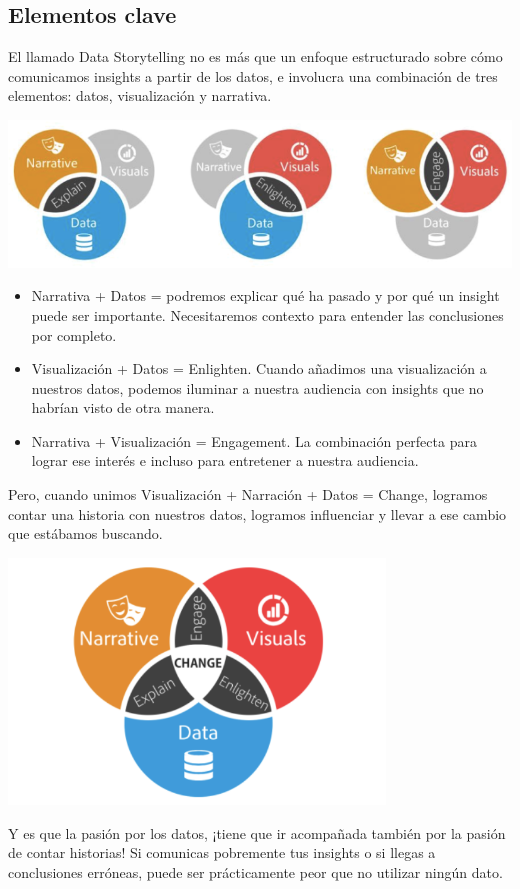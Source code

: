 \documentclass[preprint,12pt]{elsarticle}
\begin{document}
\subsection{Elementos clave}	
	El llamado Data Storytelling no es más que un enfoque estructurado sobre cómo comunicamos insights a partir de los datos, e involucra una combinación de 	tres elementos: datos, visualización y narrativa.
	\begin{center}
	\includegraphics[width=15cm]{./Imagenes/imagen1} 
	\end{center}
\begin{itemize}
\item	Narrativa + Datos = podremos explicar qué ha pasado y por qué un insight puede ser importante. Necesitaremos contexto para entender las conclusiones por completo.
\item Visualización + Datos = Enlighten. Cuando añadimos una visualización a nuestros datos, podemos iluminar a nuestra audiencia con insights que no habrían visto de otra manera.
\item	Narrativa + Visualización = Engagement. La combinación perfecta para lograr ese interés e incluso para entretener a nuestra audiencia. 
\end{itemize} 

	Pero, cuando unimos Visualización + Narración + Datos = Change, logramos contar una historia con nuestros datos, logramos influenciar y llevar a ese 			cambio que estábamos buscando.

	\begin{center}
	\includegraphics[width=10cm]{./Imagenes/imagen2} 
	\end{center}
Y es que la pasión por los datos, ¡tiene que ir acompañada también por la pasión de contar historias! Si comunicas pobremente tus insights o si llegas a conclusiones erróneas, puede ser prácticamente peor que no utilizar ningún dato.
\end{document}
